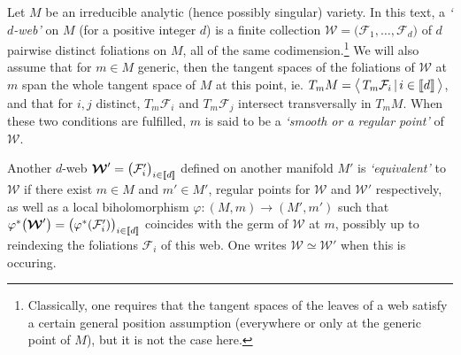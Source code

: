 \documentclass[11pt]{amsart}
\begin{document}
Let $M$ be an irreducible analytic (hence possibly singular) variety. In this text, a {\it `$d$-web'} on $M$ (for a positive integer $d$) is a finite collection $\boldsymbol{\mathcal W}=\big( \mathcal F_1,\ldots, \mathcal F_d\big)$ of $d$ pairwise distinct foliations on $M$, all of the same codimension.\footnote{Classically, one requires that the tangent spaces of the leaves of a web satisfy a certain general position assumption (everywhere or only at the generic point of $M$), but it is not the case here.} We will also assume that for $m\in M$ generic, then the tangent spaces of the foliations of $\boldsymbol{\mathcal W}$ at $m$ span the whole tangent space of $M$ at this point, ie. $T_m M= 
\big\langle \, T_m \mathcal F_i \, \lvert \, {i \in [\hspace{-0.05cm}[ d
]\hspace{-0.05cm}]}
\, \big\rangle
$, and that for $i,j$ distinct, $T_m \mathcal F_i$ and $T_m \mathcal F_j$ intersect transversally in $T_m M$. When these two conditions are fulfilled, $m$ is said to be a {\it `smooth or a regular point'} of $\boldsymbol{\mathcal W}$. 

 Another $d$-web $\boldsymbol{\mathcal W}'=\big( \mathcal F_i'\big)_ {i \in [\hspace{-0.05cm}[ d
]\hspace{-0.05cm}]}$ defined on another manifold  $M'$ is  {\it `equivalent'} to $\boldsymbol{\mathcal W}$ if there exist $m\in M$ and $m'\in M'$, regular points for 
$\boldsymbol{\mathcal W}$ and $\boldsymbol{\mathcal W}'$ respectively, as well as a local biholomorphism $\varphi: (M,m)\rightarrow (M',m')$ such that $\varphi^*\big(
 \boldsymbol{\mathcal W}'\big)=\big(\varphi^* (\mathcal F_i')\big)_ {i \in [\hspace{-0.05cm}[ d
]\hspace{-0.05cm}]}$ coincides with the germ of $\boldsymbol{\mathcal W}$ at $m$, possibly up to reindexing the foliations $\mathcal F_i$ of this web.  
One writes $\boldsymbol{\mathcal W}\simeq \boldsymbol{\mathcal W}'$ when this is occuring. 
\end{document}
